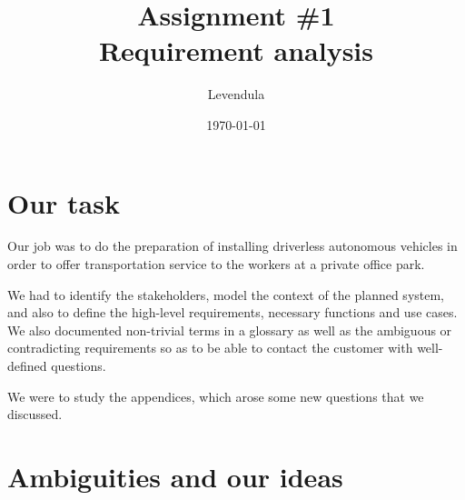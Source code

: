 \documentclass[a4paper]{article}
\title{Assignment \#1 \\ Requirement analysis}
\author{Levendula}
\date{\today}
\begin{document}


\tableofcontents
\clearpage

\section{Our task}


Our job was to do the preparation of installing \gls{driverless}
\gls{autonomous} \gls{vehicle}s in order to offer \gls{transportation} service
to the workers at a private office park.

We had to identify the \gls{stakeholder}s, model the context of the planned
system, and also to define the high-level requirements, necessary functions and
use cases. We also documented non-trivial terms in a glossary as well as the
ambiguous or contradicting requirements so as to be able to contact the customer
with well-defined questions.

We were to study the appendices, which arose some new questions that we
discussed.


\section{Ambiguities and our ideas}
\end{document}
